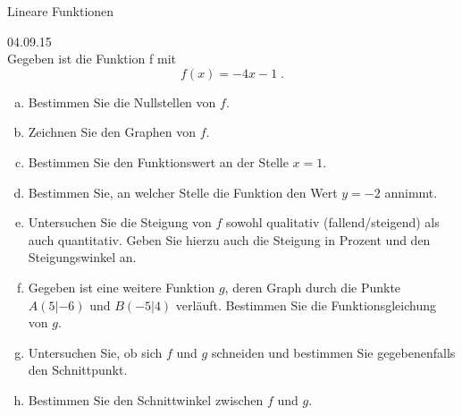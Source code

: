 \documentclass[12pt,fleqn]{article}
\theoremstyle{aufg}
\theoremstyle{bsp}
\begin{document}
 
    \begin{flushleft}
\begin{center}Lineare Funktionen\end{center} 
 04.09.15 \\[2em]Gegeben ist die Funktion f mit\[f(x)=- 4 x - 1\; . \]\begin{enumerate}[a)] 
\item 
Bestimmen Sie die Nullstellen von $f$. \\ 

\item 
Zeichnen Sie den Graphen von $f$. \\ 

\item 
Bestimmen Sie den Funktionswert an der Stelle $x=1$. \\ 

\item 
Bestimmen Sie, an welcher Stelle die Funktion den Wert $y=-2$ annimmt. \\ 

\item 
Untersuchen Sie die Steigung von $f$ sowohl qualitativ (fallend/steigend) als auch quantitativ. Geben Sie hierzu auch die Steigung in Prozent und den Steigungswinkel an. \\ 

\item 
Gegeben ist eine weitere Funktion $g$, deren Graph durch die Punkte $A(5|-6)$ und $B(-5|4)$ verl\"auft. Bestimmen Sie die Funktionsgleichung von $g$. \\ 

\item 
Untersuchen Sie, ob sich $f$ und $g$ schneiden und bestimmen Sie gegebenenfalls den Schnittpunkt. \\ 

\item 
Bestimmen Sie den Schnittwinkel zwischen $f$ und $g$. \\ 

\end{enumerate} 
\end{flushleft} 
\end{document}
